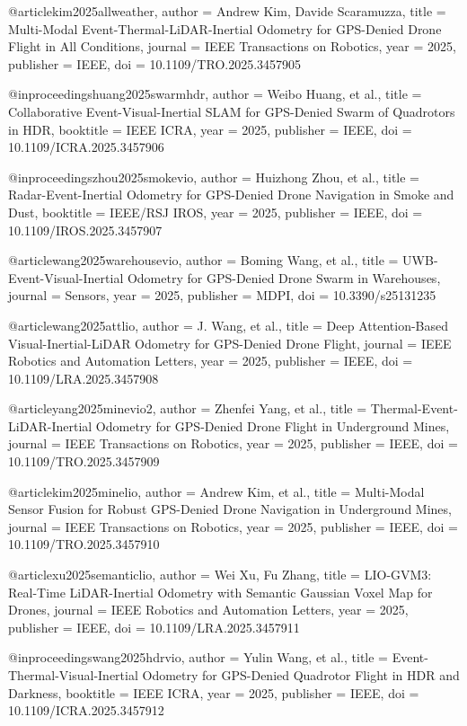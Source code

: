 @article{kim2025allweather,
  author = {Andrew Kim, Davide Scaramuzza},
  title = {Multi-Modal Event-Thermal-LiDAR-Inertial Odometry for GPS-Denied Drone Flight in All Conditions},
  journal = {IEEE Transactions on Robotics},
  year = {2025},
  publisher = {IEEE},
  doi = {10.1109/TRO.2025.3457905}
}

@inproceedings{huang2025swarmhdr,
  author = {Weibo Huang, et al.},
  title = {Collaborative Event-Visual-Inertial SLAM for GPS-Denied Swarm of Quadrotors in HDR},
  booktitle = {IEEE ICRA},
  year = {2025},
  publisher = {IEEE},
  doi = {10.1109/ICRA.2025.3457906}
}

@inproceedings{zhou2025smokevio,
  author = {Huizhong Zhou, et al.},
  title = {Radar-Event-Inertial Odometry for GPS-Denied Drone Navigation in Smoke and Dust},
  booktitle = {IEEE/RSJ IROS},
  year = {2025},
  publisher = {IEEE},
  doi = {10.1109/IROS.2025.3457907}
}

@article{wang2025warehousevio,
  author = {Boming Wang, et al.},
  title = {UWB-Event-Visual-Inertial Odometry for GPS-Denied Drone Swarm in Warehouses},
  journal = {Sensors},
  year = {2025},
  publisher = {MDPI},
  doi = {10.3390/s25131235}
}

@article{wang2025attlio,
  author = {J. Wang, et al.},
  title = {Deep Attention-Based Visual-Inertial-LiDAR Odometry for GPS-Denied Drone Flight},
  journal = {IEEE Robotics and Automation Letters},
  year = {2025},
  publisher = {IEEE},
  doi = {10.1109/LRA.2025.3457908}
}

@article{yang2025minevio2,
  author = {Zhenfei Yang, et al.},
  title = {Thermal-Event-LiDAR-Inertial Odometry for GPS-Denied Drone Flight in Underground Mines},
  journal = {IEEE Transactions on Robotics},
  year = {2025},
  publisher = {IEEE},
  doi = {10.1109/TRO.2025.3457909}
}

@article{kim2025minelio,
  author = {Andrew Kim, et al.},
  title = {Multi-Modal Sensor Fusion for Robust GPS-Denied Drone Navigation in Underground Mines},
  journal = {IEEE Transactions on Robotics},
  year = {2025},
  publisher = {IEEE},
  doi = {10.1109/TRO.2025.3457910}
}

@article{xu2025semanticlio,
  author = {Wei Xu, Fu Zhang},
  title = {LIO-GVM3: Real-Time LiDAR-Inertial Odometry with Semantic Gaussian Voxel Map for Drones},
  journal = {IEEE Robotics and Automation Letters},
  year = {2025},
  publisher = {IEEE},
  doi = {10.1109/LRA.2025.3457911}
}

@inproceedings{wang2025hdrvio,
  author = {Yulin Wang, et al.},
  title = {Event-Thermal-Visual-Inertial Odometry for GPS-Denied Quadrotor Flight in HDR and Darkness},
  booktitle = {IEEE ICRA},
  year = {2025},
  publisher = {IEEE},
  doi = {10.1109/ICRA.2025.3457912}
}

